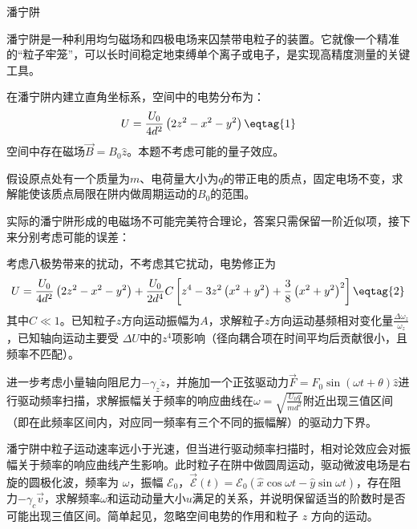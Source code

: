 \documentclass[answer]{cphos}
\begin{document}
\begin{problem}[40]{潘宁阱} 

\begin{problemstatement}
潘宁阱是一种利用均匀磁场和四极电场来囚禁带电粒子的装置。它就像一个精准的“粒子牢笼”，可以长时间稳定地束缚单个离子或电子，是实现高精度测量的关键工具。

在潘宁阱内建立直角坐标系，空间中的电势分布为：
\begin{equation}
	U=\frac{U_0}{4d^2} \left(2z^2-x^2-y^2 \right) \eqtag{1}
\end{equation}
空间中存在磁场$\vec{B}=B_0\hat{z}$。本题不考虑可能的量子效应。

假设原点处有一个质量为$m$、电荷量大小为$q$的带正电的质点，固定电场不变，求解能使该质点局限在阱内做周期运动的$B_0$的范围。

实际的潘宁阱形成的电磁场不可能完美符合理论，答案只需保留一阶近似项，接下来分别考虑可能的误差：

考虑八极势带来的扰动，不考虑其它扰动，电势修正为
\begin{equation}
	U=\frac{U_0}{4d^2}\left(2z^2-x^2-y^2\right)+\frac{U_0}{2d^4}C\left[z^4-3z^2\left(x^2+y^2\right)+\frac{3}{8}\left(x^2+y^2\right)^2\right] \eqtag{2}
\end{equation}
其中$C\ll1$。已知粒子$z$方向运动振幅为$A$，求解粒子$z$方向运动基频相对变化量$\frac{\Delta \omega_z}{\omega_z}$，已知轴向运动主要受 
$\Delta U$中的$z^4$项影响（径向耦合项在时间平均后贡献很小，且频率不匹配）。

进一步考虑小量轴向阻尼力$-\gamma_z \dot{z}$，并施加一个正弦驱动力$\vec{F}=F_0\sin \left(\omega t+\theta\right) \hat{z}$进行驱动频率扫描，求解振幅关于频率的响应曲线在$\omega=\sqrt{\frac{U_0 q}{md^2}}$附近出现三值区间（即在此频率区间内，对应同一频率有三个不同的振幅解）的驱动力下界。

潘宁阱中粒子运动速率远小于光速，但当进行驱动频率扫描时，相对论效应会对振幅关于频率的响应曲线产生影响。此时粒子在阱中做圆周运动，驱动微波电场是右旋的圆极化波，频率为 $\omega$，振幅 $\mathcal{E}_0$，$\vec{\mathcal{E}}\left(t\right) = \mathcal{E}_0 \left(\hat{x}\cos\omega t - \hat{y}\sin\omega t \right)$，存在阻力$- \gamma_c \vec{v}$，求解频率$\omega$和运动动量大小$u$满足的关系，并说明保留适当的阶数时是否可能出现三值区间。简单起见，忽略空间电势的作用和粒子 $z$ 方向的运动。



\end{problemstatement}

\begin{solution}


\end{solution}
\end{problem}
\end{document}
